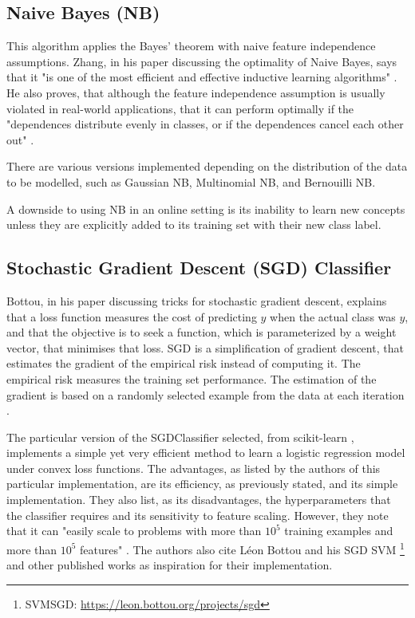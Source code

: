 \subsection{Naive Bayes (NB)}
This algorithm applies the Bayes' theorem with naive feature independence assumptions. Zhang, in his paper discussing the optimality of Naive Bayes, says that it "is one of the most efficient and effective inductive learning algorithms" \cite{zhang2004optimality}. He also proves, that although the feature independence assumption is usually violated in real-world applications, that it can perform optimally if the "dependences distribute evenly in classes, or if the dependences cancel each other out" \cite{zhang2004optimality}.

There are various versions implemented depending on the distribution of the data to be modelled, such as Gaussian NB, Multinomial NB, and Bernouilli NB.

A downside to using NB in an online setting is its inability to learn new concepts unless they are explicitly added to its training set with their new class label.

\subsection{Stochastic Gradient Descent (SGD) Classifier}
Bottou, in his paper discussing tricks for stochastic gradient descent, explains that a loss function measures the cost of predicting $\hat{y}$ when the actual class was $y$, and that the objective is to seek a function, which is parameterized by a weight vector, that minimises that loss.
SGD is a simplification of gradient descent, that estimates the gradient of the empirical risk instead of computing it. The empirical risk measures the training set performance. The estimation of the gradient is based on a randomly selected example from the data at each iteration \cite{bottou2012stochastic}.

The particular version of the SGDClassifier selected, from scikit-learn \cite{scikit-learn}, implements a simple yet very efficient method to learn a logistic regression model under convex loss functions. The advantages, as listed by the authors of this particular implementation, are its efficiency, as previously stated, and its simple implementation. They also list, as its disadvantages, the hyperparameters that the classifier requires and its sensitivity to feature scaling. However, they note that it can "easily scale to problems with more than $10^5$ training examples and more than $10^5$ features" \cite{scikit-learn-sgd}. The authors also cite Léon Bottou and his SGD SVM \cite{bottou2008learning}\footnote{SVMSGD: \url{https://leon.bottou.org/projects/sgd}} and other published works \cite{tsuruoka2009stochastic, shalev2011pegasos} as inspiration for their implementation.

